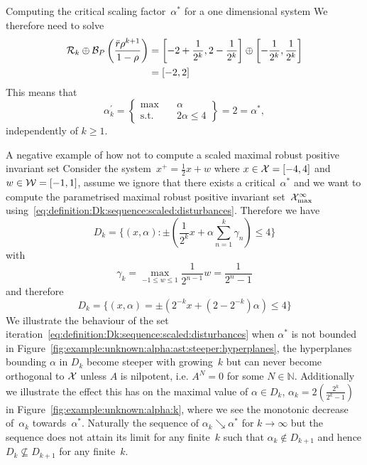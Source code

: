 \begin{example}{Computing the critical scaling factor~$\alpha^\ast$ for a one dimensional system}
%
We therefore need to solve
%
\[
\begin{aligned}
\mathcal R_k\oplus\mathcal B_P\left(\frac{\bar r\rho^{k+1}}{1-\rho}\right) &= \left[-2+\frac{1}{2^k},2-\frac{1}{2^k}\right] \oplus\left[-\frac{1}{2^k},\frac{1}{2^k}\right]\\
&=\left[-2,2\right]
\end{aligned}
\]
%
This means that 
%
\[
\alpha^\prime_k = \left\{\begin{aligned}
\max&\quad \alpha\\
\text{s.t.}&\quad 2\alpha\leq4
\end{aligned}\right\} = 2 = \alpha^\ast,
\]
%
independently of $k\geq1$.
\end{example}
%
%
%
%
%
\begin{example}{A negative example of how not to compute a scaled maximal robust positive invariant set}\label{example:alpha:star:unkown}
Consider the system~$x^+=\frac{1}{2}x+w$ where $x\in\mathcal X=[-4,4]$ and $w\in\mathcal W=[-1,1]$, assume we ignore that there exists a critical~$\alpha^\ast$ and we want to compute the parametrised maximal robust positive invariant set~$\mathcal X^\infty_{\max}$ using~\eqref{eq:definition:Dk:sequence:scaled:disturbances}.
%
Therefore we have
%
\[
	D_k = \{(x,\alpha):\pm(\frac{1}{2^k}x+\alpha\sum_{n=1}^k\gamma_n )\leq 4\}
\]
%
with
%
\[
	\gamma_k = \max_{-1\leq w\leq1}\frac{1}{2^{n-1}}w = \frac{1}{2^n-1}
\]
%
and therefore
%
\[
	D_k = \{(x,\alpha) = \pm(2^{-k}x + (2-2^{-k})\alpha)\leq4\}
\]
%
We illustrate the behaviour of the set iteration~\eqref{eq:definition:Dk:sequence:scaled:disturbances} when $\alpha^\ast$ is not bounded in Figure~\ref{fig:example:unknown:alpha:ast:steeper:hyperplanes}, the hyperplanes bounding $\alpha$ in $D_k$ become steeper with growing~$k$ but can never become orthogonal to $\mathcal X$ unless $A$ is nilpotent, i.e. $A^N=0$ for some $N\in\mathbb N$.
%
Additionally we illustrate the effect this has on the maximal value of $\alpha\in D_k$, $\alpha_k = 2\left(\frac{2^{k}}{2^k-1}\right)$ in Figure~\ref{fig:example:unknown:alpha:k}, where we see the monotonic decrease of~$\alpha_k$ towards~$\alpha^\ast$.
%
Naturally the sequence of $\alpha_k\searrow\alpha^\ast$ for $k\rightarrow\infty$ but the sequence does not attain its limit for any finite~$k$ such that $\alpha_k\not\in D_{k+1}$ and hence $D_k\not\subseteq D_{k+1}$ for any finite~$k$.
%
\begin{figure}
\centering
{}
\end{figure}
\end{example}
